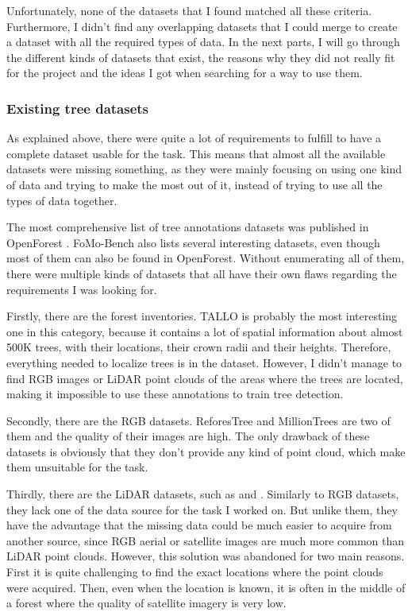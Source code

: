 \documentclass[
  letterpaper,
  DIV=11,
  numbers=noendperiod]{scrartcl}
\begin{document}
Unfortunately, none of the datasets that I found matched all these
criteria. Furthermore, I didn't find any overlapping datasets that I
could merge to create a dataset with all the required types of data. In
the next parts, I will go through the different kinds of datasets that
exist, the reasons why they did not really fit for the project and the
ideas I got when searching for a way to use them.

\subsubsection{Existing tree datasets}\label{existing-tree-datasets}

As explained above, there were quite a lot of requirements to fulfill to
have a complete dataset usable for the task. This means that almost all
the available datasets were missing something, as they were mainly
focusing on using one kind of data and trying to make the most out of
it, instead of trying to use all the types of data together.

The most comprehensive list of tree annotations datasets was published
in OpenForest \autocite{OpenForest}. FoMo-Bench \autocite{FoMo-Bench}
also lists several interesting datasets, even though most of them can
also be found in OpenForest. Without enumerating all of them, there were
multiple kinds of datasets that all have their own flaws regarding the
requirements I was looking for.

Firstly, there are the forest inventories. TALLO \autocite{TALLO} is
probably the most interesting one in this category, because it contains
a lot of spatial information about almost 500K trees, with their
locations, their crown radii and their heights. Therefore, everything
needed to localize trees is in the dataset. However, I didn't manage to
find RGB images or LiDAR point clouds of the areas where the trees are
located, making it impossible to use these annotations to train tree
detection.

Secondly, there are the RGB datasets. ReforesTree \autocite{ReforesTree}
and MillionTrees \autocite{MillionTrees} are two of them and the quality
of their images are high. The only drawback of these datasets is
obviously that they don't provide any kind of point cloud, which make
them unsuitable for the task.

Thirdly, there are the LiDAR datasets, such as \autocite{WildForest3D}
and \autocite{FOR-instance}. Similarly to RGB datasets, they lack one of
the data source for the task I worked on. But unlike them, they have the
advantage that the missing data could be much easier to acquire from
another source, since RGB aerial or satellite images are much more
common than LiDAR point clouds. However, this solution was abandoned for
two main reasons. First it is quite challenging to find the exact
locations where the point clouds were acquired. Then, even when the
location is known, it is often in the middle of a forest where the
quality of satellite imagery is very low.
\end{document}
